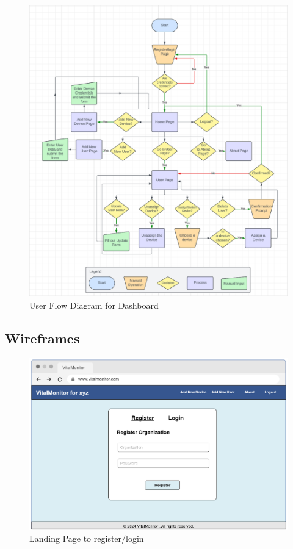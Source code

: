 \begin{figure}[!h]
    \centering
    \includegraphics[width=1\linewidth]{images/user-flow.png}
    \caption{User Flow Diagram for Dashboard}
    \label{fig:user-flow}
\end{figure}

\subsection{Wireframes}
\begin{figure}[!h]
    \centering
    \includegraphics[width=0.87\linewidth]{images/register organization.png}
    \caption{Landing Page to register/login}
    \label{fig:wf-4}
\end{figure}

